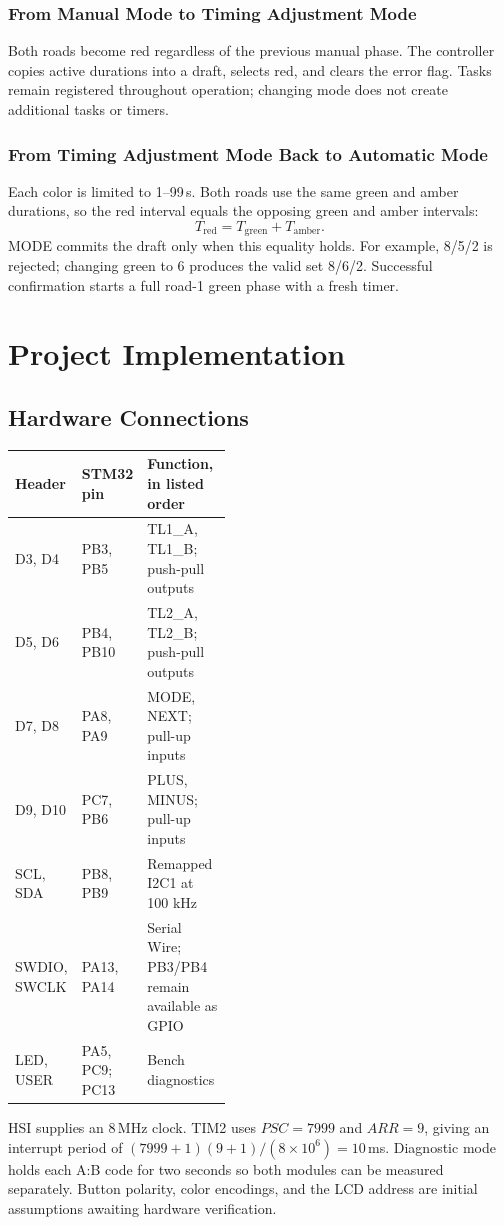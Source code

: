 \subsubsection{From Manual Mode to Timing Adjustment Mode}
Both roads become red regardless of the previous manual phase. The controller copies active durations into a draft, selects red, and clears the error flag. Tasks remain registered throughout operation; changing mode does not create additional tasks or timers.

\subsubsection{From Timing Adjustment Mode Back to Automatic Mode}
Each color is limited to 1--99\,s. Both roads use the same green and amber durations, so the red interval equals the opposing green and amber intervals:
\[
T_{\mathrm{red}}=T_{\mathrm{green}}+T_{\mathrm{amber}}.
\]
MODE commits the draft only when this equality holds. For example, 8/5/2 is rejected; changing green to 6 produces the valid set 8/6/2. Successful confirmation starts a full road-1 green phase with a fresh timer.

\section{Project Implementation}
\subsection{Hardware Connections}
\begin{center}
\begin{tabular}{l|l|p{0.43\linewidth}}
Header & STM32 pin & Function, in listed order\\ \hline
D3, D4 & PB3, PB5 & TL1\_A, TL1\_B; push-pull outputs\\
D5, D6 & PB4, PB10 & TL2\_A, TL2\_B; push-pull outputs\\
D7, D8 & PA8, PA9 & MODE, NEXT; pull-up inputs\\
D9, D10 & PC7, PB6 & PLUS, MINUS; pull-up inputs\\
SCL, SDA & PB8, PB9 & Remapped I2C1 at 100 kHz\\
SWDIO, SWCLK & PA13, PA14 & Serial Wire; PB3/PB4 remain available as GPIO\\
LED, USER & PA5, PC9; PC13 & Bench diagnostics\\
\end{tabular}
\end{center}
HSI supplies an 8\,MHz clock. TIM2 uses $PSC=7999$ and $ARR=9$, giving an interrupt period of $(7999+1)(9+1)/(8\times10^6)=10$\,ms. Diagnostic mode holds each A:B code for two seconds so both modules can be measured separately. Button polarity, color encodings, and the LCD address are initial assumptions awaiting hardware verification.

